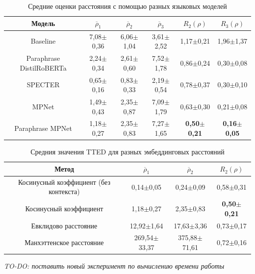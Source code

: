 \documentclass[12pt]{article}
\begin{document}
\begin{table}[h]
    \centering
    \begin{tabular}{c|c|c|c|c|c}
        Модель & $\overline{\rho}_1$ & $\overline{\rho}_2$ & $\overline{\rho}_3$ & $R_2(\rho)$ & $R_3(\rho)$ \\ \hline
        Baseline & 7,08$\pm$0,36 & 6,06$\pm$1,04 & 3,61$\pm$2,52 & 1,17$\pm$0,21 & 1,96$\pm$1,37 \\ \hline
        Paraphrase DistilRoBERTa & 2,24$\pm$0,34 & 2,61$\pm$0,60 &	7,52$\pm$1,78 & 0,86$\pm$0,24 & 0,30$\pm$0,08 \\ \hline
        SPECTER & 0,65$\pm$0,16 & 0,83$\pm$0,33 & 2,19$\pm$0,54 & 0,78$\pm$0,37 & 0,30$\pm$0,10 \\ \hline
        MPNet & 1,49$\pm$0,43 & 2,35$\pm$0,87 & 7,09$\pm$1,79 & 0,63$\pm$0,30 & 0,21$\pm$0,08 \\ \hline
        Paraphrase MPNet & 1,18$\pm$0,27 & 2,35$\pm$0,83 & 7,27$\pm$1,65 & \textbf{0,50$\pm$0,21} & \textbf{0,16$\pm$0,05}
    \end{tabular}
    \caption{Средние оценки расстояния с помощью разных языковых моделей}
    \label{tab:model_results}
\end{table}

\begin{table}[h]
    \centering
    \begin{tabular}{c|c|c|c}
        Метод & $\overline{\rho}_1$ & $\overline{\rho}_2$ & $R_2(\rho)$ \\ \hline
        Косинусный коэффициент (без контекста) & 0,14$\pm$0,05 & 0,24$\pm$0,09 & 0,58$\pm$0,31 \\ \hline
        Косинусный коэффициент & 1,18$\pm$0,27 & 2,35$\pm$0,83 & \textbf{0,50$\pm$0,21} \\ \hline
        Евклидово расстояние & 12,92$\pm$1,64 & 17,63$\pm$3,36 & 0,73$\pm$0,17 \\ \hline
        Манхэттенское расстояние & 269,54$\pm$33,37 & 375,88$\pm$71,61 & 0,72$\pm$0,16
    \end{tabular}
    \caption{Средния значения TTED для разных эмбеддинговых расстояний}
    \label{tab:modification_results}
\end{table}

\textit{TO-DO: поставить новый эксперимент по вычислению времени работы}

        
\end{document}
